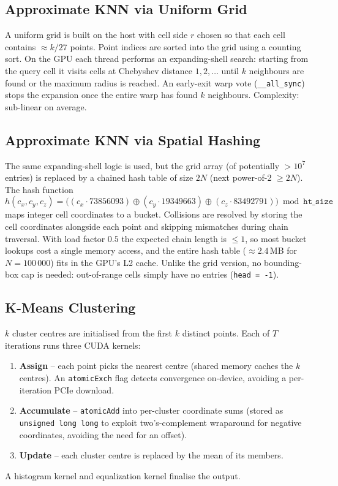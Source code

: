 \documentclass[11pt,a4paper]{article}
\begin{document}
\subsection{Approximate KNN via Uniform Grid}

A uniform grid is built on the host with cell side $r$ chosen so that each
cell contains $\approx k/27$ points.  Point indices are sorted into the grid
using a counting sort.  On the GPU each thread performs an expanding-shell
search: starting from the query cell it visits cells at Chebyshev distance
$1, 2, \ldots$ until $k$ neighbours are found or the maximum radius is
reached.  An early-exit warp vote (\texttt{\_\_all\_sync}) stops the expansion
once the entire warp has found $k$ neighbours.  Complexity: sub-linear on
average.

\subsection{Approximate KNN via Spatial Hashing}

The same expanding-shell logic is used, but the grid array (of potentially
$>10^7$ entries) is replaced by a chained hash table of size $2N$
(next power-of-2 $\ge 2N$).  The hash function
\begin{equation}
  h(c_x,c_y,c_z)
  = \bigl((c_x \cdot 73856093) \oplus (c_y \cdot 19349663) \oplus (c_z \cdot 83492791)\bigr)
  \bmod \mathtt{ht\_size}
\end{equation}
maps integer cell coordinates to a bucket.  Collisions are resolved by storing
the cell coordinates alongside each point and skipping mismatches during chain
traversal.  With load factor $0.5$ the expected chain length is $\le 1$, so
most bucket lookups cost a single memory access, and the entire hash table
($\approx 2.4$\,MB for $N=100\,000$) fits in the GPU's L2 cache.  Unlike the
grid version, no bounding-box cap is needed: out-of-range cells simply have no
entries (\texttt{head\,=\,-1}).

\subsection{K-Means Clustering}

$k$ cluster centres are initialised from the first $k$ distinct points.  Each
of $T$ iterations runs three CUDA kernels:
\begin{enumerate}
  \item \textbf{Assign} -- each point picks the nearest centre (shared memory
        caches the $k$ centres).  An \texttt{atomicExch} flag detects
        convergence on-device, avoiding a per-iteration PCIe download.
  \item \textbf{Accumulate} -- \texttt{atomicAdd} into per-cluster coordinate
        sums (stored as \texttt{unsigned long long} to exploit two's-complement
        wraparound for negative coordinates, avoiding the need for an offset).
  \item \textbf{Update} -- each cluster centre is replaced by the mean of its
        members.
\end{enumerate}
A histogram kernel and equalization kernel finalise the output.
\end{document}
